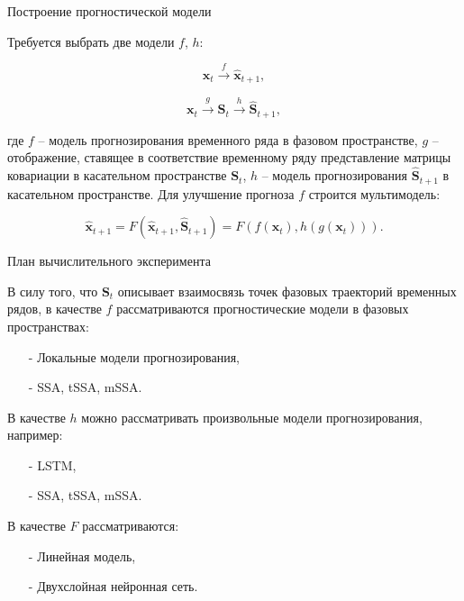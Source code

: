 \documentclass{beamer}
\begin{document}
\begin{frame}{Построение прогностической модели}

Требуется выбрать две модели $f$, $h$:

\begin{equation*}
    \mathbf{x}_t \xrightarrow{f} \hat{\mathbf{x}}_{t+1},
\end{equation*}

\begin{equation*}
    \mathbf{x}_t \xrightarrow{g} \mathbf{S}_{t} \xrightarrow{h} \hat{\mathbf{S}}_{t + 1},
\end{equation*}

где $f$ -- модель прогнозирования временного ряда в фазовом пространстве, $g$ -- отображение, ставящее в соответствие временному ряду представление матрицы ковариации в касательном пространстве $\mathbf{S}_t$, $h$ -- модель прогнозирования $\hat{\mathbf{S}}_{t + 1}$ в касательном пространстве. Для улучшение прогноза $f$ строится мультимодель:

\begin{equation*}
    \hat{\mathbf{x}}_{t + 1} = F(\hat{\mathbf{x}}_{t + 1}, \hat{\mathbf{S}}_{t + 1}) = F(f(\mathbf{x}_t), h(g(\mathbf{x}_t))).
\end{equation*}

\end{frame}
\begin{frame}{План вычислительного эксперимента}

В силу того, что $\mathbf{S}_t$ описывает взаимосвязь точек фазовых траекторий временных рядов, в качестве $f$ рассматриваются прогностические модели в фазовых пространствах:

\begin{itemize}
\item[-] Локальные модели прогнозирования,
\item[-] SSA, tSSA, mSSA.
\end{itemize}

В качестве $h$ можно рассматривать произвольные модели прогнозирования, например:

\begin{itemize}
\item[-] LSTM,
\item[-] SSA, tSSA, mSSA.
\end{itemize}

В качестве $F$ рассматриваются:

\begin{itemize}
\item[-] Линейная модель,
\item[-] Двухслойная нейронная сеть.
\end{itemize}


\end{frame}
\end{document}
